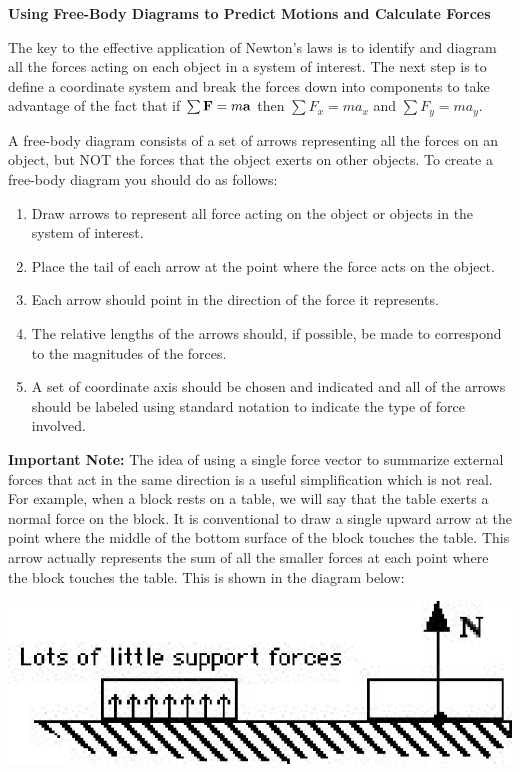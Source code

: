 \textbf{Using Free-Body Diagrams to Predict Motions and Calculate Forces }

The key to the effective application of Newton's laws is to identify and diagram
all the forces acting on each object in a system of interest. The next step
is to define a coordinate system and break the forces down into components to
take advantage of the fact that if \( \sum{\bf F}  = m{\bf a}\) then
\( \sum F_{x} = ma_{x} \) and \( \sum F_{y} =
ma_{y} \).

A free-body diagram consists of a set of arrows representing all the forces
on an object, but NOT the forces that the object exerts on other objects. To
create a free-body diagram you should do as follows: 

\begin{enumerate}
\item Draw arrows to represent all force acting on the object or objects in the system
of interest. 
\item Place the tail of each arrow at the point where the force acts on the object. 
\item Each arrow should point in the direction of the force it represents. 
\item The relative lengths of the arrows should, if possible, be made to correspond
to the magnitudes of the forces. 
\item A set of coordinate axis should be chosen and indicated and all of the arrows
should be labeled using standard notation to indicate the type of force involved.
\end{enumerate}
\textbf{Important Note:} The idea of using a single force vector to summarize
external forces that act in the same direction is a useful simplification which
is not real. For example, when a block rests on a table, we will say that the
table exerts a normal force on the block. It is conventional to draw a single
upward arrow at the point where the middle of the bottom surface of the block
touches the table. This arrow actually represents the sum of all the smaller
forces at each point where the block touches the table. This is shown in the
diagram below:

\vspace{0.3cm}
{\par\centering \includegraphics{friction_fig1.eps} \par}
\vspace{0.3cm}


